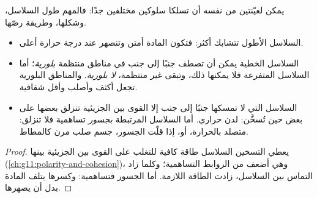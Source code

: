 يمكن لعيّنتين من  نفسه أن تسلكا سلوكين مختلفين جدًا: فالمهم
طول السلاسل، وشكلها، وطريقة رصّها.

\begin{proposition}\label{prop:g12:polymers:properties}
\begin{itemize}
  \item السلاسل الأطول تتشابك أكثر: فتكون المادة أمتن وتنصهر عند
        درجة حرارة أعلى.
  \item السلاسل الخطية يمكن أن تصطف جنبًا إلى جنب في مناطق منتظمة
        \emph{بلورية}؛ أما السلاسل المتفرعة فلا يمكنها ذلك، وتبقى
        غير منتظمة، \emph{لا بلورية}. والمناطق البلورية تجعل
         أكثف وأصلب وأقل شفافية.
  \item السلاسل التي لا تمسكها جنبًا إلى جنب إلا القوى بين الجزيئية تنزلق
        بعضها على بعض حين تُسخَّن:  لدن حراري. أما السلاسل
        المرتبطة \emph{بجسور} تساهمية فلا تنزلق: 
        متصلد بالحرارة، أو، إذا قلّت الجسور، جسم صلب
        مرن كالمطاط.
\end{itemize}
\end{proposition}

\begin{proof}
يعطي التسخين السلاسل طاقة كافية للتغلب على القوى بين الجزيئية
بينها (\cref{ch:g11:polarity-and-cohesion})، وهي
أضعف من الروابط التساهمية؛ وكلما زاد التماس بين السلاسل، زادت
الطاقة اللازمة. أما الجسور فتساهمية: وكسرها يتلف
المادة بدل أن يصهرها.
\end{proof}

